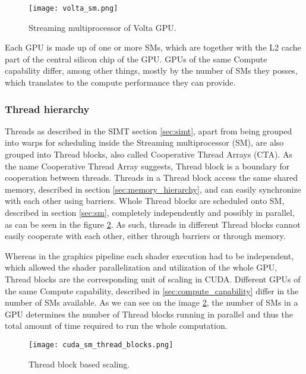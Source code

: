 \begin{figure}[h]
	\centering
	\texttt{[image: volta\_sm.png]}
	\caption{Streaming multiprocessor of Volta GPU.}
	\label{fig:cuda_volta_gpu}
\end{figure}

Each GPU is made up of one or more SMs, which are together with the L2 cache part of the central silicon chip of the GPU. GPUs of the same Compute capability differ, among other things, mostly by the number of SMs they posses, which translates to the compute performance they can provide. 


\subsubsection{Thread hierarchy}
\label{sec:thread_hierarchy}
Threads as described in the SIMT section \ref{sec:simt}, apart from being grouped into warps for scheduling inside the Streaming multiprocessor (SM), are also grouped into Thread blocks, also called Cooperative Thread Arrays (CTA). As the name Cooperative Thread Array suggests, Thread block is a boundary for cooperation between threads. Threads in a Thread block access the same shared memory, described in section \ref{sec:memory_hierarchy}, and can easily synchronize with each other using barriers.  Whole Thread blocks are scheduled onto SM, described in section \ref{sec:sm}, completely independently and possibly in parallel, as can be seen in the figure \ref{fig:sm_scaling}. As such, threads in different Thread blocks cannot easily cooperate with each other, either through barriers or through memory. 

Whereas in the graphics pipeline each shader execution had to be independent, which allowed the shader parallelization and utilization of the whole GPU, Thread blocks are the corresponding unit of scaling in CUDA. Different GPUs of the same Compute capability, described in \ref{sec:compute_capability} differ in the number of SMs available. As we can see on the image \ref{fig:sm_scaling}, the number of SMs in a GPU determines the number of Thread blocks running in parallel and thus the total amount of time required to run the whole computation.

\begin{figure}[h]
	\centering
	\texttt{[image: cuda\_sm\_thread\_blocks.png]}
	\caption{Thread block based scaling.}
	\label{fig:sm_scaling}
\end{figure}

